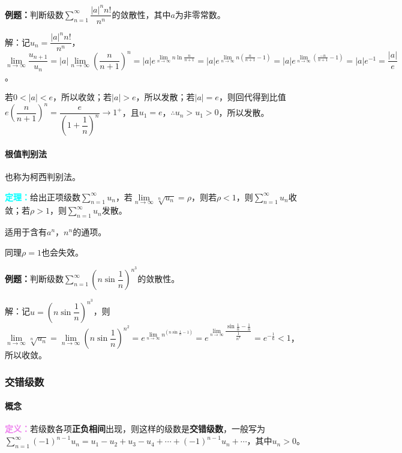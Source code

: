 \documentclass[UTF8, 12pt]{ctexart}
\begin{document}
\textbf{例题：}判断级数$\sum\limits_{n=1}^\infty\dfrac{\vert a\vert^nn!}{n^n}$的敛散性，其中$a$为非零常数。

解：记$u_n=\dfrac{\vert a\vert^nn!}{n^n}$，$\lim\limits_{n\to\infty}\dfrac{u_{n+1}}{u_n}=\vert a\vert\lim\limits_{n\to\infty}\left(\dfrac{n}{n+1}\right)^n=\vert a\vert e^{\lim\limits_{n\to\infty}n\ln\frac{n}{n+1}}=\vert a\vert e^{\lim\limits_{n\to\infty}n(\frac{n}{n+1}-1)}=\vert a\vert e^{\lim\limits_{n\to\infty}(\frac{-n}{n+1}-1)}=\vert a\vert e^{-1}=\dfrac{\vert a\vert}{e}$。

若$0<\vert a\vert<e$，所以收敛；若$\vert a\vert>e$，所以发散；若$\vert a\vert=e$，则回代得到比值$e\left(\dfrac{n}{n+1}\right)^n=\dfrac{e}{(1+\dfrac{1}{n})^n}\to1^+$，且$u_1=e$，$\therefore u_n>u_1>0$，所以发散。

\paragraph{根值判别法} \leavevmode \medskip

也称为柯西判别法。

\textcolor{aqua}{\textbf{定理：}}给出正项级数$\sum\limits_{n=1}^\infty u_n$，若$\lim\limits_{n\to\infty}\sqrt[n]{u_n}=\rho$，则若$\rho<1$，则$\sum\limits_{n=1}^\infty u_n$收敛；若$\rho>1$，则$\sum\limits_{n=1}^\infty u_n$发散。

适用于含有$a^n$，$n^n$的通项。

同理$\rho=1$也会失效。

\textbf{例题：}判断级数$\sum\limits_{n=1}^\infty\left(n\sin\dfrac{1}{n}\right)^{n^3}$的敛散性。

解：记$u=\left(n\sin\dfrac{1}{n}\right)^{n^3}$，则$\lim\limits_{n\to\infty}\sqrt[n]{u_n}=\lim\limits_{n\to\infty}\left(n\sin\dfrac{1}{n}\right)^{n^2}=e^{\lim\limits_{n\to\infty}n^(n\sin\frac{1}{n}-1)}=e^{\lim\limits_{n\to\infty}\dfrac{\sin\frac{1}{n}-\frac{1}{n}}{\frac{1}{n^3}}}=e^{-\frac{1}{6}}<1$，所以收敛。

\subsubsection{交错级数}

\paragraph{概念} \leavevmode \medskip

\textcolor{violet}{\textbf{定义：}}若级数各项\textbf{正负相间}出现，则这样的级数是\textbf{交错级数}，一般写为$\sum\limits_{n=1}^\infty(-1)^{n-1}u_n=u_1-u_2+u_3-u_4+\cdots+(-1)^{n-1}u_n+\cdots$，其中$u_n>0$。
\end{document}
